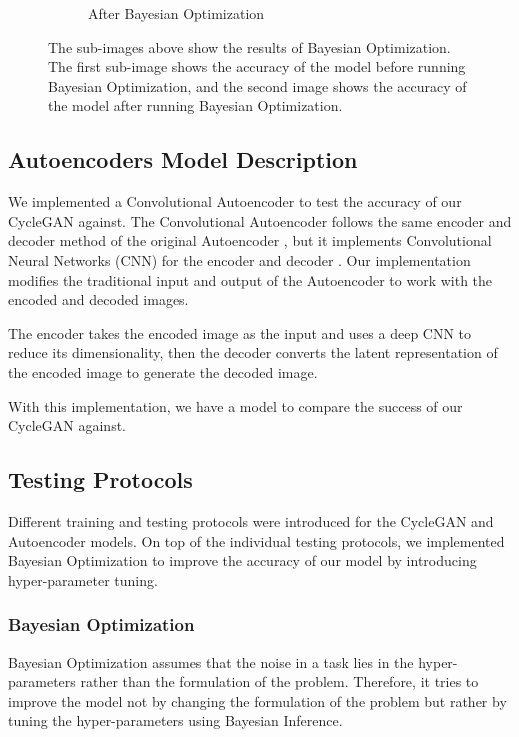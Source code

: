 \documentclass[conference]{IEEEtran}
\begin{document}
\begin{figure}[!hbt]
\begin{subfigure}[b]{0.28\textwidth}
            \caption{After Bayesian Optimization}
            \label{Bayes_Good}
    \end{subfigure}
    \hspace{0.05\textwidth}
\caption{The sub-images above show the results of Bayesian Optimization. The first sub-image shows the accuracy of the model before running Bayesian Optimization, and the second image shows the accuracy of the model after running Bayesian Optimization.}
\label{fig:bayes_opt_images}
\end{figure}

\subsection{Autoencoders Model Description}
We implemented a Convolutional Autoencoder to test the accuracy of our CycleGAN against. The Convolutional Autoencoder follows the same encoder and decoder method of the original Autoencoder \cite{ng2011sparse}, but it implements Convolutional Neural Networks (CNN) for the encoder and decoder \cite{chen_deep_2017}. Our implementation modifies the traditional input and output of the Autoencoder to work with the encoded and decoded images.

The encoder takes the encoded image as the input and uses a deep CNN to reduce its dimensionality, then the decoder converts the latent representation of the encoded image to generate the decoded image. 

With this implementation, we have a model to compare the success of our CycleGAN against. 

\subsection{Testing Protocols}
Different training and testing protocols were introduced for the CycleGAN and Autoencoder models. On top of the individual testing protocols, we implemented Bayesian Optimization to improve the accuracy of our model by introducing hyper-parameter tuning.  

\subsubsection{Bayesian Optimization}
Bayesian Optimization assumes that the noise in a task lies in the hyper-parameters rather than the formulation of the problem. Therefore, it tries to improve the model not by changing the formulation of the problem but rather by tuning the hyper-parameters using Bayesian Inference.
\end{document}
